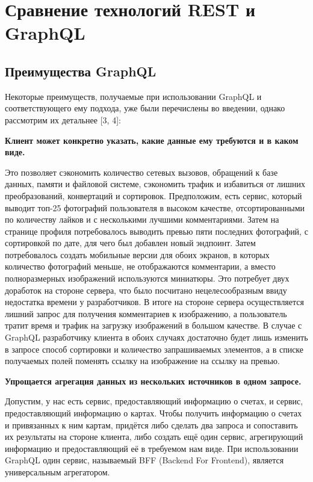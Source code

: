 \section{Сравнение технологий REST и GraphQL}\label{sec:rest-vs-graphql}

\subsection{Преимущества GraphQL}\label{subsec:graphql-advantages}

Некоторые преимуществ, получаемые при использовании GraphQL и соответствующего ему подхода, уже были перечислены во введении, однако рассмотрим их детальнее [3, 4]:

\textbf{Клиент может конкретно указать, какие данные ему требуются и в каком виде.}

Это позволяет сэкономить количество сетевых вызовов, обращений к базе данных, памяти и файловой системе, сэкономить трафик и избавиться от лишних преобразований, конвертаций и сортировок.
Предположим, есть сервис, который выводит топ-25 фотографий пользователя в высоком качестве, отсортированными по количеству лайков и с несколькими лучшими комментариями.
Затем на странице профиля потребовалось выводить превью пяти последних фотографий, с сортировкой по дате, для чего был добавлен новый эндпоинт.
Затем потребовалось создать мобильные версии для обоих экранов, в которых количество фотографий меньше, не отображаются комментарии, а вместо полноразмерных изображений используются миниатюры.
Это потребует двух доработок на стороне сервера, что было посчитано нецелесообразным ввиду недостатка времени у разработчиков.
В итоге на стороне сервера осуществляется лишний запрос для получения комментариев к изображению, а пользователь тратит время и трафик на загрузку изображений в большом качестве.
В случае с GraphQL разработчику клиента в обоих случаях достаточно будет лишь изменить в запросе способ сортировки и количество запрашиваемых элементов, а в списке получаемых полей поменять ссылку на изображение на ссылку на превью.

\textbf{Упрощается агрегация данных из нескольких источников в одном запросе.}

Допустим, у нас есть сервис, предоставляющий информацию о счетах, и сервис, предоставляющий информацию о картах.
Чтобы получить информацию о счетах и привязанных к ним картам, придётся либо сделать два запроса и сопоставить их результаты на стороне клиента, либо создать ещё один сервис, агрегирующий информацию и предоставляющий её в требуемом нам виде.
При использовании GraphQL один сервис, называемый BFF (Backend For Frontend), является универсальным агрегатором.

